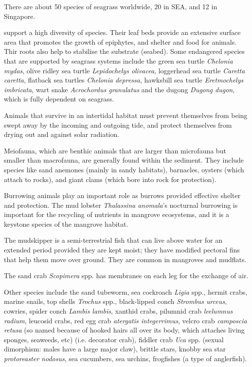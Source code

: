\documentclass{slnotes}
\newcommand{\scn}[1]{\textit{#1}}
\begin{document}
There are about 50 species of seagrass worldwide, 20 in SEA, and 12 in Singapore.

 support a high diversity of species. Their leaf beds provide an extensive surface area that promotes the growth of epiphytes, and shelter and food for animals. Thir roots also help to stabilise the substrate (seabed). Some endangered species that are supported by seagrass systems include the green sea turtle \scn{Chelonia mydas}, olive ridley sea turtle \scn{Lepidochelys olivacea}, loggerhead sea turtle \scn{Caretta caretta}, flatback sea turtles \scn{Chelonia depressa}, hawksbill sea turtle \scn{Eretmochelys imbricata}, wart snake \scn{Acrochordus granulatus} and the dugong \scn{Dugong dugon}, which is fully dependent on seagrass.

Animals that survive in an intertidal habitat must prevent themselves from being swept away by the incoming and outgoing tide, and protect themselves from drying out and against solar radiation.

Meiofauna, which are benthic animals that are larger than microfauna but smaller than macrofauna, are generally found within the sediment. They include species like sand anemones (mainly in sandy habitats), barnacles, oysters (which attach to rocks), and giant clams (which bore into rock for protection).

Burrowing animals play an important role as burrows provided effective shelter and protection. The mud lobster \scn{Thalassina anomala}'s nocturnal burrowing is important for the recycling of nutrients in mangrove ecosystems, and it is a keystone species of the mangrove habitat.

The mudskipper is a semi-terrestrial fish that can live above water for an extended period provided they are kept moist; they have modified pectoral fins that help them move over ground. They are common in mangroves and mudflats.

The sand crab \scn{Scopimera} spp. has membranes on each leg for the exchange of air.

Other species include the sand tubeworm, sea cockroach \scn{Ligia} spp., hermit crabs, marine snails, top shells \scn{Trochus} spp., black-lipped conch \scn{Strombus urceus}, cowries, spider conch \scn{Lambis lambis}, xanthid crabs, pilumnid crab \scn{leelumnus radium}, leucosid crabs, red egg crab \scn{atergatis integerrimus}, velcro crab \scn{camposcia retusa} (so named because of hooked hairs all over its body, which attaches living sponges, seaweeds, etc) (i.e. decorator crab), fiddler crab \scn{Uca} spp. (sexual dimorphism: males have a large major claw), brittle stars, knobby sea star \scn{protoreaster nodosus}, sea cucumbers, sea urchins, frogfishes (a type of anglerfish).
\end{document}
